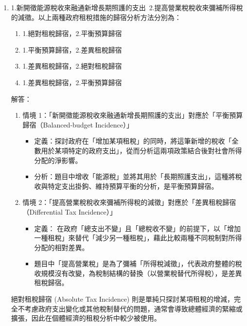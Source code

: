 \documentclass[12pt, a4paper]{article}
\begin{document}
\begin{enumerate}
    \item 1.新開徵能源稅收來融通新增長期照護的支出\ 2.提高營業稅稅收來彌補所得稅的減徵。以上兩種政府租稅措施的歸宿分析方法分別為：
    \begin{enumerate}[label=\Alph*.]
        \item 1.絕對租稅歸宿，2.平衡預算歸宿
        \item 1.平衡預算歸宿，2.差異租稅歸宿
        \item 1.差異租稅歸宿，2.絕對租稅歸宿
        \item 1.差異租稅歸宿，2.平衡預算歸宿
    \end{enumerate}
    解答：
    \begin{enumerate}[1.]
        \item 情境 1：「新開徵能源稅收來融通新增長期照護的支出」對應於「平衡預算歸宿（Balanced-budget Incidence）」
        \begin{itemize}
            \item 定義：探討政府在「增加某項租稅」的同時，將這筆新增的稅收「全數用於某項特定的政府支出」，從而分析這兩項政策結合後對社會所得分配的淨影響。
            \item 分析：題目中增收「能源稅」並將其用於「長期照護支出」，這種將稅收與特定支出掛鉤、維持預算平衡的分析，是平衡預算歸宿。
        \end{itemize}
        \item 情境 2：「提高營業稅稅收來彌補所得稅的減徵」對應於「差異租稅歸宿（Differential Tax Incidence）」
        \begin{itemize}
            \item 定義： 在政府「總支出不變」且「總稅收不變」的前提下，以「增加一種租稅」來替代「減少另一種租稅」，藉此比較兩種不同稅制對所得分配的相對差異。
            \item 題目中「提高營業稅」是為了彌補「所得稅減徵」，代表政府整體的稅收規模沒有改變，為稅制結構的替換（以營業稅替代所得稅），是差異租稅歸宿。
        \end{itemize}
    \end{enumerate}
    絕對租稅歸宿 (Absolute Tax Incidence) 則是單純只探討某項租稅的增減，完全不考慮政府支出變化或其他稅制替代的問題，通常會導致總體經濟的緊縮或擴張，因此在個體經濟的租稅分析中較少被使用。


\end{enumerate}
\end{document}

